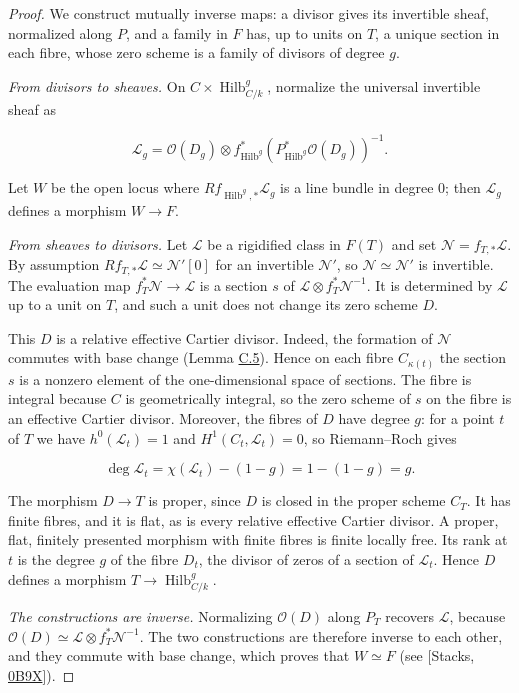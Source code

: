\documentclass[11pt]{article}
\begin{document}
\begin{proof}[{Proof}]\label{bp143}%
We construct mutually inverse maps: a divisor gives its invertible sheaf, normalized along \(P\), and a family in \(F\) has, up to units on \(T\), a unique section in each fibre, whose zero scheme is a family of divisors of degree \(g\).

\emph{From divisors to sheaves.} On \(C\times \operatorname{Hilb}^{g}_{C/k}\), normalize the universal invertible sheaf as

\[
\mathcal L_g=\mathcal O(D_g)\otimes
f_{\operatorname{Hilb}^g}^*(P_{\operatorname{Hilb}^g}^*\mathcal O(D_g))^{-1}.
\]

Let \(W\) be the open locus where \(Rf_{\operatorname{Hilb}^g,*}\mathcal L_g\) is a line bundle in degree \(0\); then \(\mathcal L_g\) defines a morphism \(W\to F\).

\emph{From sheaves to divisors.} Let \(\mathcal L\) be a rigidified class in \(F(T)\) and set \(\mathcal N=f_{T,*}\mathcal L\). By assumption \(Rf_{T,*}\mathcal L\simeq\mathcal N'[0]\) for an invertible \(\mathcal N'\), so \(\mathcal N\simeq\mathcal N'\) is invertible. The evaluation map \(f_T^*\mathcal N\to\mathcal L\) is a section \(s\) of \(\mathcal L\otimes f_T^*\mathcal N^{-1}\). It is determined by \(\mathcal L\) up to a unit on \(T\), and such a unit does not change its zero scheme \(D\).

This \(D\) is a relative effective Cartier divisor. Indeed, the formation of \(\mathcal N\) commutes with base change (Lemma \hyperref[bp135]{C.5}). Hence on each fibre \(C_{\kappa(t)}\) the section \(s\) is a nonzero element of the one-dimensional space of sections. The fibre is integral because \(C\) is geometrically integral, so the zero scheme of \(s\) on the fibre is an effective Cartier divisor. Moreover, the fibres of \(D\) have degree \(g\): for a point \(t\) of \(T\) we have \(h^0(\mathcal L_t)=1\) and \(H^1(C_t,\mathcal L_t)=0\), so Riemann–Roch gives

\[
\deg\mathcal L_t
=\chi(\mathcal L_t)-(1-g)=1-(1-g)=g.
\]

The morphism \(D\to T\) is proper, since \(D\) is closed in the proper scheme \(C_T\). It has finite fibres, and it is flat, as is every relative effective Cartier divisor. A proper, flat, finitely presented morphism with finite fibres is finite locally free. Its rank at \(t\) is the degree \(g\) of the fibre \(D_t\), the divisor of zeros of a section of \(\mathcal L_t\). Hence \(D\) defines a morphism \(T\to \operatorname{Hilb}^{g}_{C/k}\).

\emph{The constructions are inverse.} Normalizing \(\mathcal O(D)\) along \(P_T\) recovers \(\mathcal L\), because \(\mathcal O(D)\simeq\mathcal L\otimes f_T^*\mathcal N^{-1}\). The two constructions are therefore inverse to each other, and they commute with base change, which proves that \(W\simeq F\) (see [Stacks, \href{https://stacks.math.columbia.edu/tag/0B9X}{0B9X}]).
\end{proof}
\end{document}
